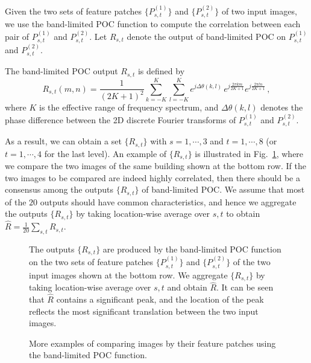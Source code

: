 \documentclass[conference]{IEEEtran}
\begin{document}
Given the two sets of feature patches $\{P_{s,t}^{(1)}\}$ and $\{P_{s,t}^{(2)}\}$ of two input images, we use the band-limited POC function to compute the correlation between each pair of $P_{s,t}^{(1)}$ and $P_{s,t}^{(2)}$. Let $R_{s,t}$ denote the output of band-limited POC on $P_{s,t}^{(1)}$ and $P_{s,t}^{(2)}$. 

The band-limited POC output $R_{s,t}$ is defined by
\begin{equation}
R_{s,t}(m, n) = \frac{1}{(2K+1)^2} \sum_{k=-K}^K \sum_{l=-K}^K e^{j \Delta\theta(k,l)} 
 \, e^{j \frac{2 \pi k m}{2K+1}}  e^{j \frac{2 \pi l n}{2K+1}}  \,,
\end{equation}
where $K$ is the effective range of frequency spectrum, and $\Delta\theta(k,l)$ denotes the phase difference between the 2D discrete Fourier transforms of $P_{s,t}^{(1)}$ and $P_{s,t}^{(2)}$. 

As a result, we can obtain a set $\{R_{s,t}\}$ with $s=1,\cdots,3$ and $t=1,\cdots,8$ (or $t=1,\cdots,4$ for the last level). An example of $\{R_{s,t}\}$ is illustrated in Fig.~\ref{fig:eecs_comp}, where we compare the two images of the same building shown at the bottom row. If the two images to be compared are indeed highly correlated, then there should be a consensus among the outputs $\{R_{s,t}\}$ of band-limited POC. We assume that most of the $20$ outputs should have common characteristics, and hence we aggregate the outputs $\{R_{s,t}\}$ by taking location-wise average over $s, t$ to obtain
$\hat{R} = \frac{1}{20} \sum_{s,t} R_{s,t}$.

\begin{figure}
\centering
{}
\caption{The outputs $\{R_{s,t}\}$ are produced by the band-limited POC function on the two sets of feature patches $\{P_{s,t}^{(1)}\}$ and $\{P_{s,t}^{(2)}\}$ of the two input images shown at the bottom row. We aggregate $\{R_{s,t}\}$ by taking location-wise average over $s, t$ and obtain $\hat{R}$. It can be seen that $\hat{R}$ contains a significant peak, and the location of the peak reflects the most significant translation between the two input images.}
\label{fig:eecs_comp}
\end{figure}


\begin{figure*}[t]
\centering
{}
\caption{More examples of comparing images by their feature patches using the band-limited POC function.}
\label{fig:poc_more_examples}
\end{figure*}
\end{document}
